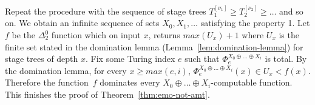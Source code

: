 Repeat the procedure with the sequence of stage trees $T_1^{[\nu_1]} \geq T_2^{[\nu_2]} \geq \dots$ and so on.
We obtain an infinite sequence of sets $X_0, X_1, \dots$ satisfying the property 1.
Let $f$ be the $\Delta^0_2$ function which on input $x$, returns $max(U_x)+1$ where
$U_x$ is the finite set stated in the domination lemma (Lemma~\ref{lem:domination-lemma}) for stage trees of depth $x$.
Fix some Turing index $e$ such that $\Phi^{X_0 \oplus \dots \oplus X_i}_e$ is total.
By the domination lemma, for every $x \geq max(e,i)$, $\Phi^{X_0 \oplus \dots \oplus X_i}_e(x) \in U_x < f(x)$.
Therefore the function~$f$ dominates every $X_0 \oplus \dots \oplus X_i$-computable function.
This finishes the proof of Theorem~\ref{thm:emo-not-amt}.


